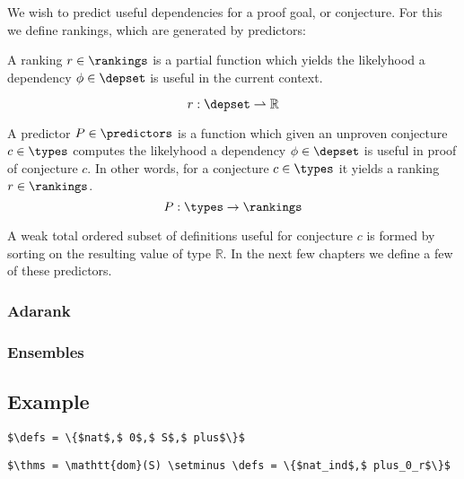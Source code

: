 We wish to predict useful dependencies for a proof goal, or conjecture.
For this we define rankings, which are generated by predictors:

\begin{definition}
  A ranking $r \in \rankings$ is a partial function which yields the likelyhood a
  dependency $\phi \in \depset$ is useful in the current context.

  $$
    r : \depset \rightharpoonup \mathbb{R}
  $$
\end{definition}

\begin{definition}
  A predictor $P \in \predictors$ is a function which given an unproven conjecture $c \in \types$
  computes the likelyhood a dependency $\phi \in \depset$ is useful in proof of conjecture $c$.
  In other words, for a conjecture $c \in \types$ it yields a ranking $r \in \rankings$.
  $$
    P : \types \rightarrow \rankings
  $$
\end{definition}

A weak total ordered subset of definitions useful for conjecture $c$ is formed by sorting on the resulting value of type $\mathbb{R}$.
In the next few chapters we define a few of these predictors.

\subsubsection{\knn}


\subsubsection{\knnadaptive}


\subsubsection{\nb}


\subsubsection{Adarank}


\subsubsection{Ensembles}

\subsection{Example}

\begin{lstlisting}[language=Coq, mathescape, frame=none]
$\defs = \{$nat$,$ 0$,$ S$,$ plus$\}$
\end{lstlisting}

\begin{lstlisting}[language=Coq, mathescape, frame=none]
$\thms = \mathtt{dom}(S) \setminus \defs = \{$nat_ind$,$ plus_0_r$\}$
\end{lstlisting}
